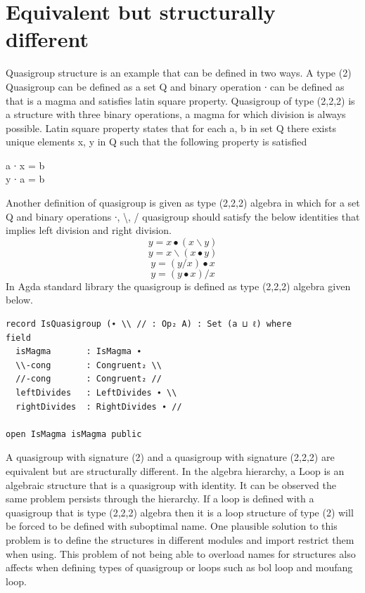 \section{Equivalent but structurally different}
Quasigroup structure is an example that can be defined in two ways. A type (2)
Quasigroup can be defined as a set Q and binary operation ∙ can be defined as
that is a magma and satisfies latin square property. Quasigroup of type (2,2,2)
is a structure with three binary operations, a magma for which division is
always possible. Latin square property states that for each a, b in set Q there
exists unique elements x, y in Q such that the following property is satisfied
\cite{quasigroupWiki}
\begin{center}
a ∙ x = b\\
y ∙ a = b \\
\end{center}
Another definition of quasigroup is given as type (2,2,2) algebra in which for a
set Q and binary operations ∙, \textbackslash{}, / quasigroup should satisfy
the below identities that implies left division and right division. 
\[y = x ∙ (x \backslash y)\]
\[y = x \backslash (x ∙ y)\]
\[y = (y / x) ∙ x\]
\[y = (y ∙ x) / x\]
In Agda standard library the quasigroup is defined as type (2,2,2) algebra given
below.

\begin{verbatim}
record IsQuasigroup (∙ \\ // : Op₂ A) : Set (a ⊔ ℓ) where
field
  isMagma       : IsMagma ∙
  \\-cong       : Congruent₂ \\
  //-cong       : Congruent₂ //
  leftDivides   : LeftDivides ∙ \\
  rightDivides  : RightDivides ∙ //

open IsMagma isMagma public
\end{verbatim}

A quasigroup with signature (2) and a quasigroup with signature (2,2,2) are
equivalent but are structurally different.  In the algebra hierarchy, a Loop is
an algebraic structure that is a quasigroup with identity. It can be observed
the same problem persists through the hierarchy. If a loop is defined with a
quasigroup that is type (2,2,2) algebra then it is a loop structure of type (2)
will be forced to be defined with suboptimal name. One plausible solution to
this problem is to define the structures in different modules and import
restrict them when using. This problem of not being able to overload names for
structures also affects when defining types of quasigroup or loops such as bol
loop and moufang loop.


